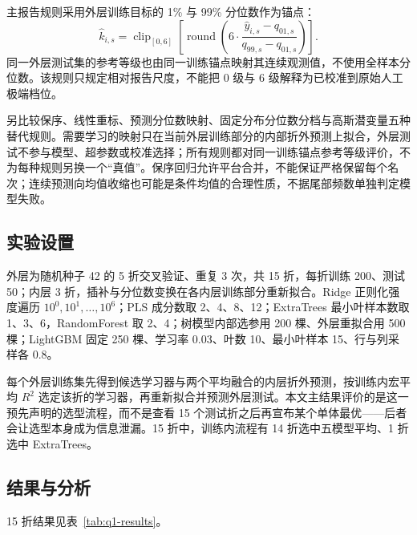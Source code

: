 \documentclass[UTF8,a4paper,zihao=-4]{ctexart}
\numberwithin{figure}{section}
\numberwithin{table}{section}
\numberwithin{equation}{section}
\begin{document}
主报告规则采用外层训练目标的 1\% 与 99\% 分位数作为锚点：
\begin{equation}
\hat k_{i,s}=\operatorname{clip}_{[0,6]}\left[\operatorname{round}\left(6\cdot\frac{\hat y_{i,s}-q_{01,s}}{q_{99,s}-q_{01,s}}\right)\right].
\label{eq:grade}
\end{equation}
同一外层测试集的参考等级也由同一训练锚点映射其连续观测值，不使用全样本分位数。该规则只规定相对报告尺度，不能把 0 级与 6 级解释为已校准到原始人工极端档位。

另比较保序、线性重标、预测分位数映射、固定分布分位数分档与高斯潜变量五种替代规则。需要学习的映射只在当前外层训练部分的内部折外预测上拟合，外层测试不参与模型、超参数或校准选择；所有规则都对同一训练锚点参考等级评价，不为每种规则另换一个“真值”。保序回归允许平台合并，不能保证严格保留每个名次；连续预测向均值收缩也可能是条件均值的合理性质，不据尾部频数单独判定模型失败。

\subsection{实验设置}

外层为随机种子 42 的 5 折交叉验证、重复 3 次，共 15 折，每折训练 200、测试 50；内层 3 折，插补与分位数变换在各内层训练部分重新拟合。Ridge 正则化强度遍历 $10^{0},10^{1},\dots,10^{6}$；PLS 成分数取 2、4、8、12；ExtraTrees 最小叶样本数取 1、3、6，RandomForest 取 2、4；树模型内部选参用 200 棵、外层重拟合用 500 棵；LightGBM 固定 250 棵、学习率 0.03、叶数 10、最小叶样本 15、行与列采样各 0.8。

每个外层训练集先得到候选学习器与两个平均融合的内层折外预测，按训练内宏平均 $R^2$ 选定该折的学习器，再重新拟合并预测外层测试。本文主结果评价的是这一预先声明的选型流程，而不是查看 15 个测试折之后再宣布某个单体最优——后者会让选型本身成为信息泄漏。15 折中，训练内流程有 14 折选中五模型平均、1 折选中 ExtraTrees。

\subsection{结果与分析}

15 折结果见表~\ref{tab:q1-results}。
\end{document}
